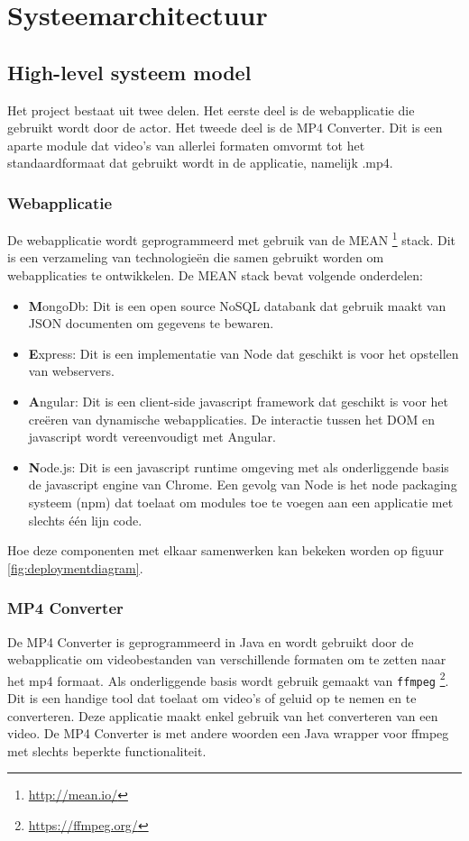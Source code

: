 \chapter{Systeemarchitectuur}
\label{ch:systeemarchitectuur}
\section{High-level systeem model}
Het project bestaat uit twee delen. Het eerste deel is de webapplicatie die gebruikt wordt door de actor. Het tweede deel is de MP4 Converter. Dit is een aparte module dat video's van allerlei formaten omvormt tot het standaardformaat dat gebruikt wordt in de applicatie, namelijk .mp4.
\subsection{Webapplicatie}
De webapplicatie wordt geprogrammeerd met gebruik van de MEAN \footnote{\url{http://mean.io/}} stack. Dit is een verzameling van technologieën die samen gebruikt worden om webapplicaties te ontwikkelen. De MEAN stack bevat volgende onderdelen:
\begin{itemize}
 \item \textbf{M}ongoDb: Dit is een open source NoSQL databank dat gebruik maakt van JSON documenten om gegevens te bewaren. 
 \item \textbf{E}xpress: Dit is een implementatie van Node dat geschikt is voor het opstellen van webservers. 
 \item \textbf{A}ngular: Dit is een client-side javascript framework dat geschikt is voor het creëren van dynamische webapplicaties. De interactie tussen het DOM en javascript wordt vereenvoudigt met Angular.
 \item \textbf{N}ode.js: Dit is een javascript runtime omgeving met als onderliggende basis de javascript engine van Chrome. Een gevolg van Node is het node packaging systeem (npm) dat toelaat om modules toe te voegen aan een applicatie met slechts één lijn code.
\end{itemize}
Hoe deze componenten met elkaar samenwerken kan bekeken worden op figuur \ref{fig:deploymentdiagram}.

\subsection{MP4 Converter}
De MP4 Converter is geprogrammeerd in Java en wordt gebruikt door de webapplicatie om videobestanden van verschillende formaten om te zetten naar het mp4 formaat. Als onderliggende basis wordt gebruik gemaakt van \texttt{ffmpeg} \footnote{\url{https://ffmpeg.org/}}. Dit is een handige tool dat toelaat om video's of geluid op te nemen en te converteren. Deze applicatie maakt enkel gebruik van het converteren van een video. De MP4 Converter is met andere woorden een Java wrapper voor ffmpeg met slechts beperkte functionaliteit.




